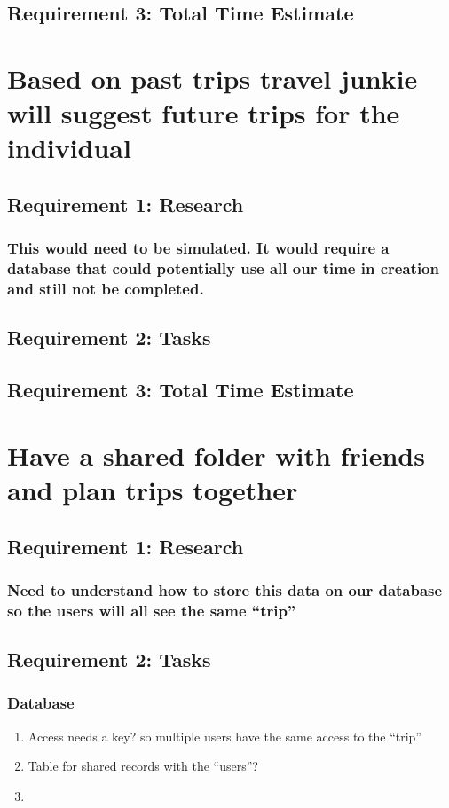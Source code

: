 \documentclass [10pt] {article}
\begin{document}
\subsection{Requirement 3: Total Time Estimate}


\section{Based on past trips travel junkie will suggest future trips for the individual}
\subsection{Requirement 1: Research}
\subsubsection{This would need to be simulated.  It would require a database that could potentially use all our time in creation and still not be completed.}
\subsection{Requirement 2: Tasks}
\subsection{Requirement 3: Total Time Estimate}


\section{Have a shared folder with friends and plan trips together}
\subsection{Requirement 1: Research}
\subsubsection{Need to understand how to store this data on our database so the users will all see the same ``trip''}
\subsection{Requirement 2: Tasks}
\subsubsection{Database}
\begin{enumerate}
\item Access needs a key? so multiple users have the same access to the ``trip''
\item Table for shared records with the ``users''?
\item 
\end{enumerate}
\end{document}
